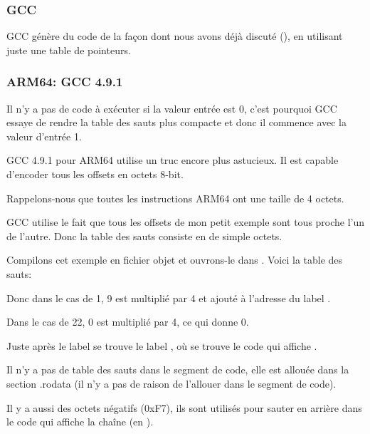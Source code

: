 \subsubsection{GCC}

GCC génère du code de la façon dont nous avons déjà discuté (),
en utilisant juste une table de pointeurs.

\subsubsection{ARM64: GCC 4.9.1 \Optimizing}

Il n'y a pas de code à exécuter si la valeur entrée est 0, c'est pourquoi GCC
essaye de rendre la table des sauts plus compacte et donc il commence avec la
valeur d'entrée 1.

GCC 4.9.1 pour ARM64 utilise un truc encore plus astucieux.
Il est capable d'encoder tous les offsets en octets 8-bit.

Rappelons-nous que toutes les instructions ARM64 ont une taille de 4 octets.

GCC utilise le fait que tous les offsets de mon petit exemple sont tous proche l'un
de l'autre. Donc la table des sauts consiste en de simple octets.



Compilons cet exemple en fichier objet et ouvrons-le dans \IDA. Voici la table des
sauts:



Donc dans le cas de 1, 9 est multiplié par 4 et ajouté à l'adresse
du label .

Dans le cas de 22, 0 est multiplié par 4, ce qui donne 0.

Juste après le label  se trouve le label , où se trouve le code
qui affiche .

Il n'y a pas de table des sauts dans le segment de code, elle est allouée dans
la section .rodata (il n'y a pas de raison de l'allouer dans le segment de code).

Il y a aussi des octets négatifs (0xF7), ils sont utilisés pour sauter en arrière
dans le code qui affiche la chaîne (en ).

